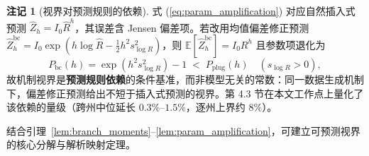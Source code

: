 \documentclass[10pt,a4paper]{article}
\theoremstyle{plain}
\theoremstyle{definition}
\newtheorem*{remark}{注记}
\begin{document}
\begin{remark}[视界对预测规则的依赖]\label{rem:predictor}
式 (\ref{eq:param_amplification}) 对应自然插入式预测 $\hat{Z}_h = I_0 \hat{R}^h$，其误差含 Jensen 偏差项。若改用均值偏差修正预测 $\hat{Z}_h^{\text{bc}} = I_0 \exp\!\left(h\log\hat{R} - \tfrac{1}{2} h^2 s_{\log R}^2\right)$，则 $\mathbb{E}[\hat{Z}_h^{\text{bc}}] = I_0 R^h$ 且参数项退化为
\begin{equation}
P_{\text{bc}}(h) = \exp\!\left(h^2 s_{\log R}^2\right) - 1 \;<\; P_{\text{plug}}(h) \quad (s_{\log R} > 0),
\label{eq:p_bc}
\end{equation}
故机制视界是\textbf{预测规则依赖}的条件基准，而非模型无关的常数：同一数据生成机制下，偏差修正预测给出不短于插入式预测的视界。第 4.3 节在本文工作点上量化了该依赖的量级（跨州中位延长 $0.3\%$--$1.5\%$，逐州上界约 $8\%$）。
\end{remark}

结合引理~\ref{lem:branch_moments}--\ref{lem:param_amplification}，可建立可预测视界的核心分解与解析映射定理。
\end{document}
